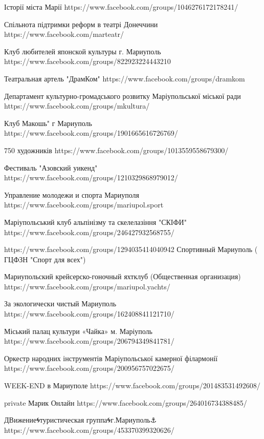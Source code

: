  
 
 
 
 

Історії міста Марії
https://www.facebook.com/groups/1046276172178241/

Спільнота підтримки реформ в театрі Донеччини
https://www.facebook.com/marteatr/

Клуб любителей японской культуры г. Мариуполь
https://www.facebook.com/groups/822923224443210

Театральная артель "ДрамКом"
https://www.facebook.com/groups/dramkom

Департамент культурно-громадського розвитку Маріупольської міської ради
https://www.facebook.com/groups/mkultura/

Клуб Макошь" г Мариуполь
https://www.facebook.com/groups/1901665616726769/

750 художників
https://www.facebook.com/groups/1013559558679300/

Фестиваль "Азовский уикенд"
https://www.facebook.com/groups/1210329868979012/

Управление молодежи и спорта Мариуполя
https://www.facebook.com/groups/mariupol.sport

Маріупольський клуб альпінізму та скелелазіння "СКІФИ"
https://www.facebook.com/groups/246427932568755/

https://www.facebook.com/groups/1294035414040942
Спортивный Мариуполь ( ГЦФЗН "Спорт для всех")

Мариупольский крейсерско-гоночный яхтклуб (Общественная организация)
https://www.facebook.com/groups/mariupol.yachts/

За экологически чистый Мариуполь
https://www.facebook.com/groups/162408841121710/

Міський палац культури «Чайка» м. Маріуполь
https://www.facebook.com/groups/206794349841781/

Оркестр народних інструментів Маріупольської камерної філармонії
https://www.facebook.com/groups/200956757022675/

WEEK-END в Мариуполе
https://www.facebook.com/groups/201483531492608/

private
Марик Онлайн
https://www.facebook.com/groups/264016734388485/

ДВижение🌀туристическая группа🌀г.Мариуполь⚓
https://www.facebook.com/groups/453370399320626/

